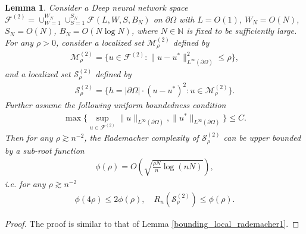 \documentclass{article}
\newcommand{\F}{\mathcal{F}}
\theoremstyle{plain}
\newtheorem{lemma}[theorem]{Lemma}
\theoremstyle{definition}
\theoremstyle{remark}
\begin{document}
\begin{lemma} \label{bounding_local_rademacher2}
    Consider a Deep neural network space $\F^{(2)} = \cup_{W = 1}^{W_N} \cup_{S = 1}^{S_N} \F(L, W, S, B_N)$ on $\partial\Omega$ with $L = O(1)$, $W_N = O(N)$, $S_N = O(N)$, $B_N = O(N \log N)$, where $N \in \mathbb{N}$ is fixed to be sufficiently large. For any $\rho > 0$, consider a localized set $\mathcal{M}_\rho^{(2)}$ defined by 
    \begin{align*}
        \mathcal{M}_\rho^{(2)} = \{u \in \F^{(2)}: \|u-u^*\|_{L^\infty(\partial\Omega)}^2 \leq \rho\},
    \end{align*}
    and a localized set 
    $\mathcal{S}_\rho^{(2)}$ defined by
    \begin{align*}
        \mathcal{S}_\rho^{(2)} = \{h = |\partial \Omega|\cdot(u-u^*)^2: u \in \mathcal{M}_\rho^{(2)}\}.
    \end{align*}
    Further assume the following uniform boundedness condition 
    \begin{align*}
        \max \{ \sup_{u \in \F^{(2)}} \| u \|_{L^\infty(\partial \Omega)}, \|u^*\|_{L^\infty(\partial\Omega)}\} \leq C.
    \end{align*}
    Then for any $\rho \gtrsim n^{-2}$, the Rademacher complexity of $\mathcal{S}_\rho^{(2)}$
    can be upper bounded by a sub-root function
    \begin{align*}
        \phi(\rho) = O\left(\sqrt{\frac{\rho N}{n} \log(n N)}\right),
    \end{align*}
    i.e. for any $\rho \gtrsim n^{-2}$
    \begin{align*}
        \phi(4 \rho) \leq 2\phi(\rho), \quad R_{n} (\mathcal{S}_\rho^{(2)}) \leq \phi(\rho). 
    \end{align*}
    \end{lemma}
\begin{proof}
    The proof is similar to that of Lemma \ref{bounding_local_rademacher1}. 
\end{proof}
\end{document}
